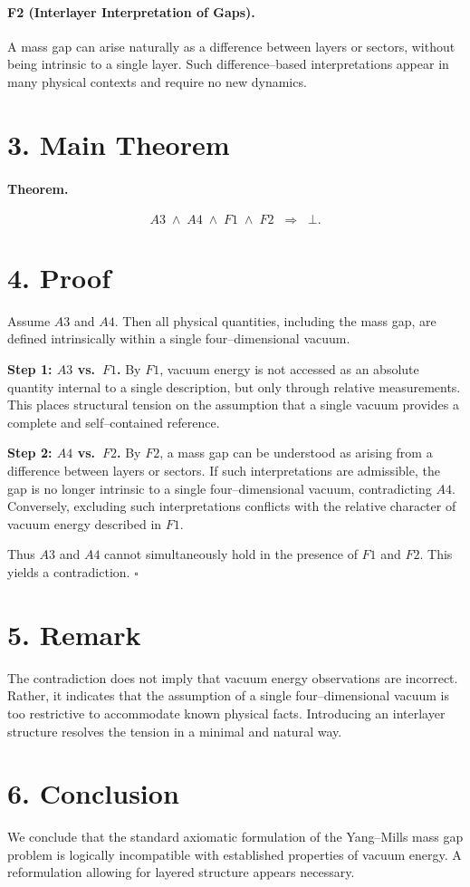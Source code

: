 \documentclass[11pt]{article}
\begin{document}
\paragraph{F2 (Interlayer Interpretation of Gaps).}
A mass gap can arise naturally as a difference between layers or sectors,
without being intrinsic to a single layer.
Such difference--based interpretations appear in many physical contexts
and require no new dynamics.

\section*{3. Main Theorem}

\paragraph{Theorem.}
\[
A3 \;\land\; A4 \;\land\; F1 \;\land\; F2 \;\;\Rightarrow\;\; \bot .
\]

\section*{4. Proof}

Assume $A3$ and $A4$.
Then all physical quantities, including the mass gap, are defined intrinsically within a single four--dimensional vacuum.

\medskip
\noindent
\textbf{Step 1: $A3$ vs.\ $F1$.}
By $F1$, vacuum energy is not accessed as an absolute quantity internal to a single description,
but only through relative measurements.
This places structural tension on the assumption that a single vacuum provides
a complete and self--contained reference.

\medskip
\noindent
\textbf{Step 2: $A4$ vs.\ $F2$.}
By $F2$, a mass gap can be understood as arising from a difference between layers or sectors.
If such interpretations are admissible,
the gap is no longer intrinsic to a single four--dimensional vacuum,
contradicting $A4$.
Conversely, excluding such interpretations conflicts with the relative character of vacuum energy described in $F1$.

\medskip
Thus $A3$ and $A4$ cannot simultaneously hold in the presence of $F1$ and $F2$.
This yields a contradiction.
\hfill $\square$

\section*{5. Remark}

The contradiction does not imply that vacuum energy observations are incorrect.
Rather, it indicates that the assumption of a single four--dimensional vacuum
is too restrictive to accommodate known physical facts.
Introducing an interlayer structure resolves the tension in a minimal and natural way.

\section*{6. Conclusion}

We conclude that the standard axiomatic formulation of the Yang--Mills mass gap problem
is logically incompatible with established properties of vacuum energy.
A reformulation allowing for layered structure appears necessary.
\end{document}
